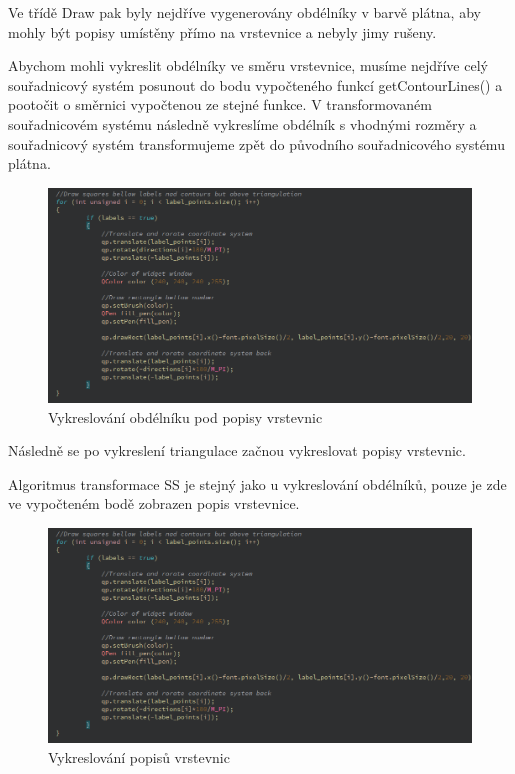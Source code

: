 \documentclass[11pt]{article}
\begin{document}
Ve třídě Draw pak byly nejdříve vygenerovány obdélníky v barvě plátna, aby mohly být popisy umístěny přímo na vrstevnice a nebyly jimy rušeny. 

Abychom mohli vykreslit obdélníky ve směru vrstevnice, musíme nejdříve celý souřadnicový systém posunout do bodu vypočteného funkcí getContourLines() a pootočit o směrnici vypočtenou ze stejné funkce. V transformovaném souřadnicovém systému následně vykreslíme obdélník s vhodnými rozměry a souřadnicový systém transformujeme zpět do původního souřadnicového systému plátna.

\begin{figure}[htbh]
	\centering
	\includegraphics[scale=0.5]{images/DrawLabelSquares.png} 
	\caption{Vykreslování obdélníku pod popisy vrstevnic}
	\label{fig:DrawLabelSquares}
\end{figure} 

Následně se po vykreslení triangulace začnou vykreslovat popisy vrstevnic. 

Algoritmus transformace SS je stejný jako u vykreslování obdélníků, pouze je zde ve vypočteném bodě zobrazen popis vrstevnice.

\begin{figure}[htbh]
	\centering
	\includegraphics[scale=0.5]{images/DrawLabelSquares.png} 
	\caption{Vykreslování popisů vrstevnic}
	\label{fig:DrawLabels}
\end{figure}
\end{document}
